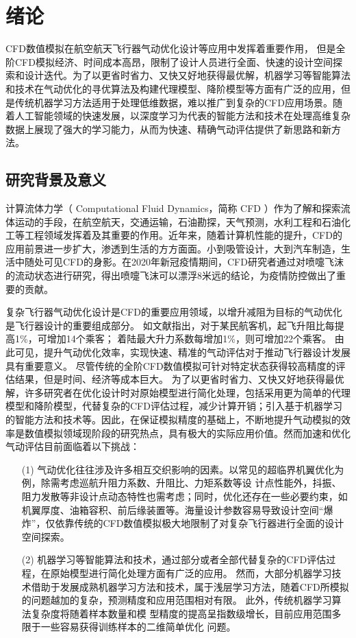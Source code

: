 \chapter{绪论}
CFD数值模拟在航空航天飞行器气动优化设计等应用中发挥着重要作用，
但是全阶CFD模拟经济、时间成本高昂，限制了设计人员进行全面、快速的设计空间探索和设计迭代。为了以更省时省力、又快又好地获得最优解，机器学习等智能算法和技术在气动优化的寻优算法及构建代理模型、降阶模型等方面有广泛的应用，但是传统机器学习方法适用于处理低维数据，难以推广到复杂的CFD应用场景。随着人工智能领域的快速发展，以深度学习为代表的智能方法和技术在处理高维复杂数据上展现了强大的学习能力，从而为快速、精确气动评估提供了新思路和新方法。



\section{研究背景及意义}
计算流体力学（ Computational Fluid Dynamics，简称 CFD ）作为了解和探索流体运动的手段，在航空航天，交通运输，石油勘探，天气预测，水利工程和石油化工等工程领域发挥着及其重要的作用。近年来，随着计算机性能的提升，CFD的应用前景进一步扩大，渗透到生活的方方面面。小到吸管设计，大到汽车制造，生活中随处可见CFD的身影。在2020年新冠疫情期间，CFD研究者通过对喷嚏飞沫的流动状态进行研究，得出喷嚏飞沫可以漂浮8米远的结论，为疫情防控做出了重要的贡献\cite{JAMA-喷嚏}。

复杂飞行器气动优化设计是CFD的重要应用领域，以增升减阻为目标的气动优化是飞行器设计的重要组成部分。
如文献\cite{增升减阻ep}指出，对于某民航客机，起飞升阻比每提高1\%，可增加14个乘客；
着陆最大升力系数每增加1\%，则可增加22个乘客。
由此可见，提升气动优化效率，实现快速、精准的气动评估对于推动飞行器设计发展具有重要意义。
尽管传统的全阶CFD数值模拟可针对特定状态获得较高精度的评估结果，但是时间、经济等成本巨大。
为了以更省时省力、又快又好地获得最优解，许多研究者在优化设计时对原始模型进行简化处理，包括采用更为简单的代理模型\cite{代理模型}和降阶模型\cite{降阶模型}，代替复杂的CFD评估过程，减少计算开销；引入基于机器学习的智能方法和技术等。因此，在保证模拟精度的基础上，不断地提升气动模拟的效率是数值模拟领域现阶段的研究热点，具有极大的实际应用价值。然而加速和优化气动评估目前面临着以下挑战：

\vspace{-0.2cm}
\begin{itemize}
	\item[(1)] 气动优化往往涉及许多相互交织影响的因素。以常见的超临界机翼优化为例，除需考虑巡航升阻力系数、升阻比、力矩系数等设
	计点性能外，抖振、阻力发散等非设计点动态特性也需考虑；同时，优化还存在一些必要约束，如机翼厚度、油箱容积、前后缘装置等。海量设计参数容易导致设计空间“爆炸”，仅依靠传统的CFD数值模拟极大地限制了对复杂飞行器进行全面的设计空间探索。
	\item[(2)] 机器学习等智能算法和技术，通过部分或者全部代替复杂的CFD评估过程，在原始模型进行简化处理方面有广泛的应用。
	然而，大部分机器学习技术借助于发展成熟机器学习方法和技术，属于浅层学习方法，随着CFD所模拟的问题越加的复杂，预测精度和应用范围相对有限。
	此外，传统机器学习算法复杂度将随着样本数量和模
	型精度的提高呈指数级增长，目前应用范围多限于一些容易获得训练样本的二维简单优化
	问题。

\end{itemize}

